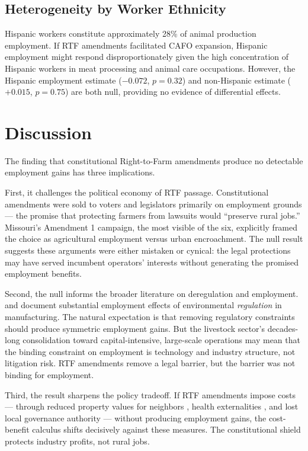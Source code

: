 \documentclass[12pt]{article}
\begin{document}


\subsection{Heterogeneity by Worker Ethnicity}

Hispanic workers constitute approximately 28\% of animal production employment. If RTF amendments facilitated CAFO expansion, Hispanic employment might respond disproportionately given the high concentration of Hispanic workers in meat processing and animal care occupations. However, the Hispanic employment estimate ($-0.072$, $p = 0.32$) and non-Hispanic estimate ($+0.015$, $p = 0.75$) are both null, providing no evidence of differential effects.


\section{Discussion}
\label{sec:discussion}

The finding that constitutional Right-to-Farm amendments produce no detectable employment gains has three implications.

First, it challenges the political economy of RTF passage. Constitutional amendments were sold to voters and legislators primarily on employment grounds --- the promise that protecting farmers from lawsuits would ``preserve rural jobs.'' Missouri's Amendment 1 campaign, the most visible of the six, explicitly framed the choice as agricultural employment versus urban encroachment. The null result suggests these arguments were either mistaken or cynical: the legal protections may have served incumbent operators' interests without generating the promised employment benefits.

Second, the null informs the broader literature on deregulation and employment. \citet{greenstone2002} and \citet{walker2013} document substantial employment effects of environmental \textit{regulation} in manufacturing. The natural expectation is that removing regulatory constraints should produce symmetric employment gains. But the livestock sector's decades-long consolidation toward capital-intensive, large-scale operations \citep{macdonald2009, key2007, macdonald2000} may mean that the binding constraint on employment is technology and industry structure, not litigation risk. RTF amendments remove a legal barrier, but the barrier was not binding for employment.

Third, the result sharpens the policy tradeoff. If RTF amendments impose costs --- through reduced property values for neighbors \citep{palmquist1997, herriges2005, lawley2021}, health externalities \citep{sneeringer2009health, osterberg2004}, and lost local governance authority \citep{centner2006} --- without producing employment gains, the cost-benefit calculus shifts decisively against these measures. The constitutional shield protects industry profits, not rural jobs.
\end{document}
